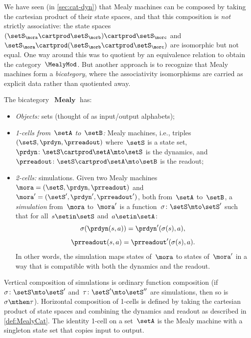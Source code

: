 \begin{example}
    \label{exa:bicat-mealy}
    We have seen (in \cref{sec:cat-dyn}) that Mealy machines can be composed by taking the cartesian product of their state spaces, and that this composition is \emph{not} strictly associative: the state spaces~$(\setS_\mora \cartprod \setS_\morb) \cartprod \setS_\morc$ and~$\setS_\mora \cartprod (\setS_\morb \cartprod \setS_\morc)$ are isomorphic but not equal.
    One way around this was to quotient by an equivalence relation to obtain the category~$\MealyMod$.
    But another approach is to recognize that Mealy machines form a \emph{bicategory}, where the associativity isomorphisms are carried as explicit data rather than quotiented away.

    The bicategory~$\operatorname{\textbf{Mealy}}$ has:
    \begin{itemize}
        \item \emph{Objects:} sets (thought of as input/output alphabets);
        \item \emph{1-cells from~$\setA$ to~$\setB$:} Mealy machines, i.e., triples~$(\setS, \prdyn, \prreadout)$ where~$\setS$ is a state set, $\prdyn \colon \setS \cartprod \setA \mto \setS$ is the dynamics, and~$\prreadout \colon \setS \cartprod \setA \mto \setB$ is the readout;
        \item \emph{2-cells:} simulations.
              Given two Mealy machines~$\mora = (\setS, \prdyn, \prreadout)$ and~$\mora' = (\setS', \prdyn', \prreadout')$, both from~$\setA$ to~$\setB$, a \emph{simulation} from~$\mora$ to~$\mora'$ is a function~$\sigma \colon \setS \mto \setS'$ such that for all~$s \setin \setS$ and~$a \setin \setA$:
              \begin{equation}\label{eq:mealy-simulation-dyn}
                  \sigma(\prdyn(s, a)) = \prdyn'(\sigma(s), a),
              \end{equation}
              \begin{equation}\label{eq:mealy-simulation-ro}
                  \prreadout(s, a) = \prreadout'(\sigma(s), a).
              \end{equation}
              In other words, the simulation maps states of~$\mora$ to states of~$\mora'$ in a way that is compatible with both the dynamics and the readout.
    \end{itemize}
    Vertical composition of simulations is ordinary function composition (if~$\sigma \colon \setS \mto \setS'$ and~$\tau \colon \setS' \mto \setS''$ are simulations, then so is~$\sigma \mthen \tau$).
    Horizontal composition of 1-cells is defined by taking the cartesian product of state spaces and combining the dynamics and readout as described in \cref{def:MealyCat}.
    The identity 1-cell on a set~$\setA$ is the Mealy machine with a singleton state set that copies input to output.


\end{example}
